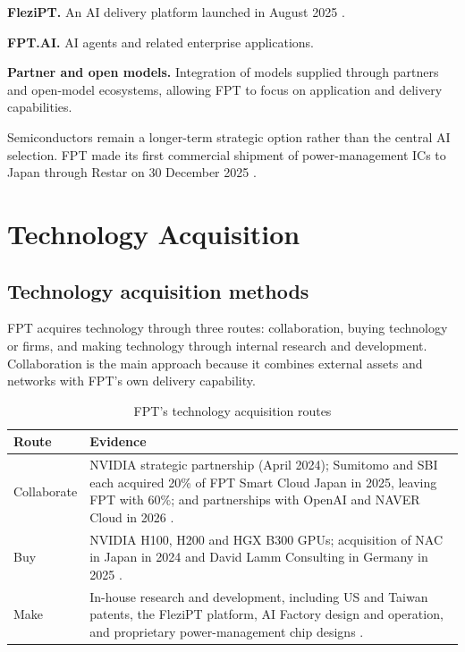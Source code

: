 \documentclass[a4paper,12pt]{report}
\begin{document}
\textbf{FleziPT.} An AI delivery platform launched in August 2025 \cite{S18}.

\textbf{FPT.AI.} AI agents and related enterprise applications.

\textbf{Partner and open models.} Integration of models supplied through partners and open-model ecosystems, allowing FPT to focus on application and delivery capabilities.

Semiconductors remain a longer-term strategic option rather than the central AI selection. FPT made its first commercial shipment of power-management ICs to Japan through Restar on 30 December 2025 \cite{M4,M5,S19}.

\chapter{Technology Acquisition}

\section{Technology acquisition methods}

FPT acquires technology through three routes: collaboration, buying technology or firms, and making technology through internal research and development. Collaboration is the main approach because it combines external assets and networks with FPT's own delivery capability.

\begin{table}[H]
\centering
\caption{FPT's technology acquisition routes}
\label{tab:acquisition-routes}
\renewcommand{\arraystretch}{1.15}
\begin{tabular}{p{} p{}}
\toprule
\textbf{Route} & \textbf{Evidence} \\
\midrule
Collaborate & NVIDIA strategic partnership (April 2024); Sumitomo and SBI each acquired 20\% of FPT Smart Cloud Japan in 2025, leaving FPT with 60\%; and partnerships with OpenAI and NAVER Cloud in 2026 \cite{S5,S6,A6,A7}. \\
Buy & NVIDIA H100, H200 and HGX B300 GPUs; acquisition of NAC in Japan in 2024 and David Lamm Consulting in Germany in 2025 \cite{A15,A21,S12}. \\
Make & In-house research and development, including US and Taiwan patents, the FleziPT platform, AI Factory design and operation, and proprietary power-management chip designs \cite{S14,S18,S19}. \\
\bottomrule
\end{tabular}
\end{table}
\end{document}
